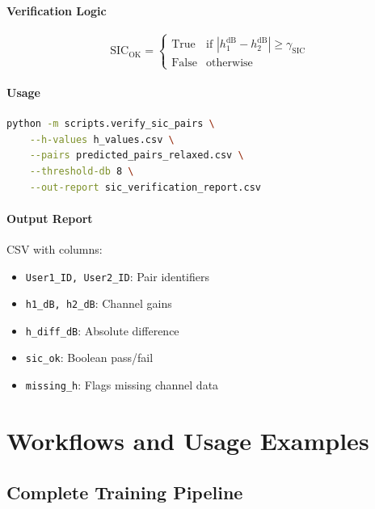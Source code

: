 \documentclass[12pt,a4paper]{article}
\begin{document}
\paragraph{Verification Logic}
\begin{equation}
\text{SIC}_{\text{OK}} = \begin{cases}
\text{True} & \text{if } |h_1^{\text{dB}} - h_2^{\text{dB}}| \geq \gamma_{\text{SIC}} \\
\text{False} & \text{otherwise}
\end{cases}
\end{equation}

\paragraph{Usage}
\begin{lstlisting}[language=bash]
python -m scripts.verify_sic_pairs \
    --h-values h_values.csv \
    --pairs predicted_pairs_relaxed.csv \
    --threshold-db 8 \
    --out-report sic_verification_report.csv
\end{lstlisting}

\paragraph{Output Report}
CSV with columns:
\begin{itemize}
    \item \texttt{User1\_ID, User2\_ID}: Pair identifiers
    \item \texttt{h1\_dB, h2\_dB}: Channel gains
    \item \texttt{h\_diff\_dB}: Absolute difference
    \item \texttt{sic\_ok}: Boolean pass/fail
    \item \texttt{missing\_h}: Flags missing channel data
\end{itemize}

\section{Workflows and Usage Examples}

\subsection{Complete Training Pipeline}
\end{document}
